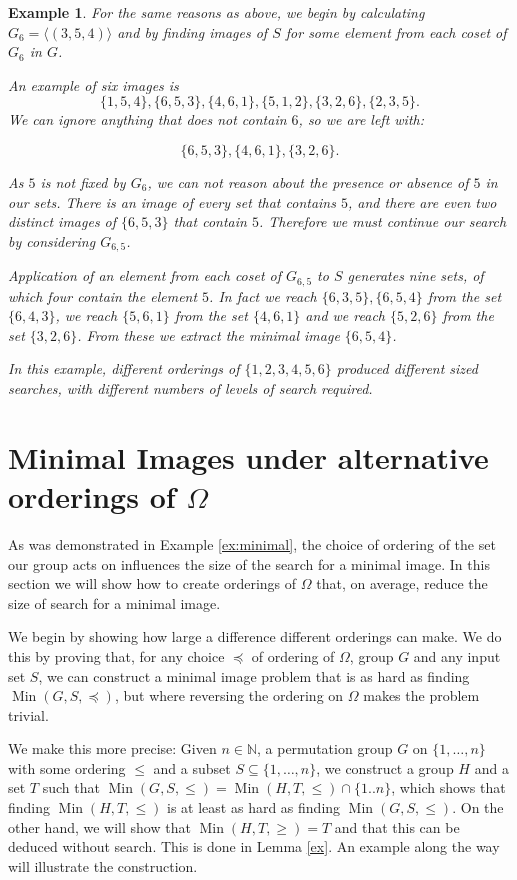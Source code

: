 \documentclass[preprint,12pt]{elsarticle}
\newtheorem{ex}[theorem]{Example}
\newcommand{\N}{\mathbb{N}}
\newcommand{\Min}{\operatorname{Min}}
\begin{document}
\begin{ex}
  For the same reasons as above, we begin by calculating
  $G_6 = \langle (3,5,4) \rangle$ and by finding images of \(S\) for some
  element from each coset of \(G_6\) in $G$.

  An example of six images is
  \[
    \{ 1, 5, 4 \}, \{ 6, 5, 3 \}, \{ 4, 6, 1 \}, \{ 5, 1, 2 \}, \{ 3, 2, 6 \},
    \{ 2, 3, 5 \}.
  \]
  We can ignore anything that does not contain \(6\), so we are left with:

  \[
    \{ 6, 5, 3 \}, \{ 4, 6, 1 \}, \{ 3, 2, 6 \}.
  \]

  As \(5\) is not fixed by \(G_6\), we can not reason about the presence
  or absence of \(5\) in our sets. There is an image of every set that
  contains \(5\), and there are even two distinct images of \(\{6,5,3\}\) that
  contain \(5\). Therefore we must continue our search by considering \(G_{6,5}\).

  Application of an element from each coset of $G_{6,5}$ to $S$ generates nine
  sets, of which four contain the element $5$. In fact we reach \(\{6,3,5\},
  \{6,5,4\}\) from the set $\{ 6, 4, 3 \}$, we reach \(\{5,6,1\}\) from the set
  $\{ 4, 6, 1 \}$ and we reach \(\{5,2,6\}\) from the set $\{ 3, 2, 6 \}$. From
  these we extract the minimal image \(\{6,5,4\}\).

  In this example, different orderings of \(\{1,2,3,4,5,6\}\) produced different sized
  searches, with different numbers of levels of search required.
\end{ex}

\section{Minimal Images under alternative orderings of \(\Omega\)}
\label{sec:alternate ordering}
As was demonstrated in Example \ref{ex:minimal}, the choice of ordering of the set our group acts on
influences the size of the search for a minimal image. In this section we will show
how to create
orderings of $\Omega$ that, on average, reduce the size of search for a minimal image.

We begin by showing how large a difference different orderings can make. We do
this by proving that, for any choice $\preccurlyeq$ of ordering of \(\Omega\), group \(G\) and
any input set $S$, we can construct a minimal image
problem that is as hard as finding \(\Min(G,S,\preccurlyeq)\), but where
reversing the ordering on $\Omega$ makes the problem trivial.

We make this more precise: Given $n \in \N$, a permutation group \(G\) on \(\{1,\dots,n\}\) with some ordering $\leq$ and a subset \(S
\subseteq \{1,\dots,n\}\), we construct a group \(H\) and a set \(T\) such that
\(\Min(G, S, \leq) = \Min(H,T, \leq) \cap \{1..n\}\), which shows that finding
\(\Min(H,T,\leq)\) is at least as hard as finding \(\Min(G,S,\leq)\). On the
other hand, we will show that \(\Min(H,T, \geq) = T\) and that this can be deduced without search.
This is done in Lemma \ref{ex}.
An example along the way will illustrate the construction.
\end{document}
